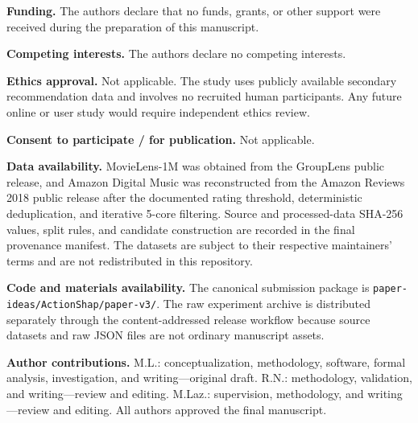 \documentclass[pdflatex,sn-basic,Numbered]{sn-jnl}
\theoremstyle{thmstyleone}
\theoremstyle{thmstyletwo}
\theoremstyle{thmstylethree}
\begin{document}
\textbf{Funding.} The authors declare that no funds, grants, or other support were received during the preparation of this manuscript.

\textbf{Competing interests.} The authors declare no competing interests.

\textbf{Ethics approval.} Not applicable. The study uses publicly available secondary recommendation data and involves no recruited human participants. Any future online or user study would require independent ethics review.

\textbf{Consent to participate / for publication.} Not applicable.

\textbf{Data availability.} MovieLens-1M was obtained from the GroupLens public release, and Amazon Digital Music was reconstructed from the Amazon Reviews 2018 public release after the documented rating threshold, deterministic deduplication, and iterative 5-core filtering. Source and processed-data SHA-256 values, split rules, and candidate construction are recorded in the final provenance manifest. The datasets are subject to their respective maintainers' terms and are not redistributed in this repository.

\textbf{Code and materials availability.} The canonical submission package is \texttt{paper-ideas/ActionShap/paper-v3/}. The raw experiment archive is distributed separately through the content-addressed release workflow because source datasets and raw JSON files are not ordinary manuscript assets.

\textbf{Author contributions.} M.L.: conceptualization, methodology, software, formal analysis, investigation, and writing---original draft. R.N.: methodology, validation, and writing---review and editing. M.Laz.: supervision, methodology, and writing---review and editing. All authors approved the final manuscript.



\end{document}
